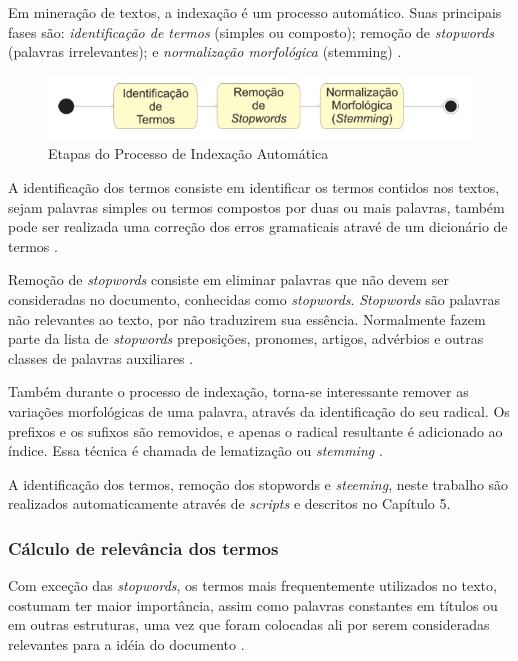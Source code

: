 Em mineração de textos, a indexação é um processo automático. Suas principais fases são: \textit{identificação de termos} (simples ou composto); remoção de \textit{stopwords} (palavras irrelevantes); e \textit{normalização morfológica} (stemming) \cite{morais2007mineraccao}.

\begin{figure}[H] %
	\caption{\label{fig:figura-4} Etapas do Processo de Indexação Automática}
	\begin{center}
	    \includegraphics[scale=0.8]{figuras/figura_4.PNG} %
	\end{center}
\end{figure}

A identificação dos termos consiste em identificar os termos contidos nos textos, sejam palavras simples ou termos compostos por duas ou mais palavras, também pode ser realizada uma correção dos erros gramaticais atravé de um dicionário de termos \cite{morais2007mineraccao}. 

Remoção de \textit{stopwords} consiste em eliminar palavras que não devem ser consideradas no documento, conhecidas como \textit{stopwords}. \textit{Stopwords} são palavras não relevantes ao texto, por não traduzirem sua essência. Normalmente fazem parte da lista de \textit{stopwords} preposições, pronomes, artigos, advérbios e outras classes de palavras auxiliares \cite{morais2007mineraccao}.

Também durante o processo de indexação, torna-se interessante remover as variações morfológicas de uma palavra, através da identificação do seu radical. Os prefixos e os sufixos são removidos, e apenas o radical resultante é adicionado ao índice. Essa técnica é chamada de lematização ou \textit{stemming} \cite{morais2007mineraccao}.

A identificação dos termos, remoção dos stopwords e \textit{steeming}, neste trabalho são realizados automaticamente através de \textit{scripts} e descritos no Capítulo 5.

\subsubsection{Cálculo de relevância dos termos}
Com exceção das \textit{stopwords}, os termos mais frequentemente utilizados no texto, costumam ter maior importância, assim como palavras constantes em títulos ou em outras estruturas, uma vez que foram colocadas ali por serem consideradas relevantes para a idéia do documento \cite{morais2007mineraccao}.

